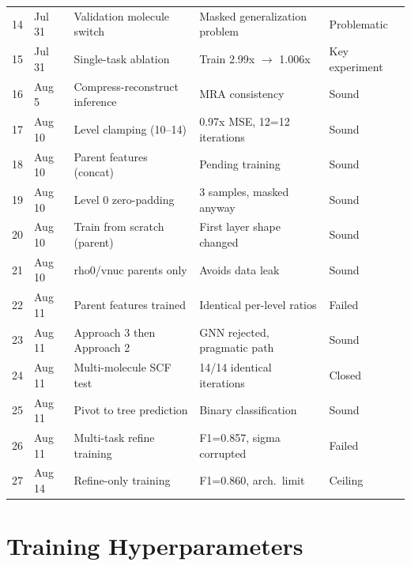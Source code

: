 \documentclass[journal=jctcce]{achemso}
\begin{document}
\begin{longtable}{clp{5cm}p{4cm}l}
14 & Jul 31 & Validation molecule switch & Masked generalization problem & Problematic \\
15 & Jul 31 & Single-task ablation & Train 2.99x $\to$ 1.006x & Key experiment \\
16 & Aug 5 & Compress-reconstruct inference & MRA consistency & Sound \\
17 & Aug 10 & Level clamping (10--14) & 0.97x MSE, 12=12 iterations & Sound \\
18 & Aug 10 & Parent features (concat) & Pending training & Sound \\
19 & Aug 10 & Level 0 zero-padding & 3 samples, masked anyway & Sound \\
20 & Aug 10 & Train from scratch (parent) & First layer shape changed & Sound \\
21 & Aug 10 & rho0/vnuc parents only & Avoids data leak & Sound \\
22 & Aug 11 & Parent features trained & Identical per-level ratios & Failed \\
23 & Aug 11 & Approach 3 then Approach 2 & GNN rejected, pragmatic path & Sound \\
24 & Aug 11 & Multi-molecule SCF test & 14/14 identical iterations & Closed \\
25 & Aug 11 & Pivot to tree prediction & Binary classification & Sound \\
26 & Aug 11 & Multi-task refine training & F1=0.857, sigma corrupted & Failed \\
27 & Aug 14 & Refine-only training & F1=0.860, arch.\ limit & Ceiling \\
\bottomrule
\end{longtable}

\section{Training Hyperparameters}
\end{document}

